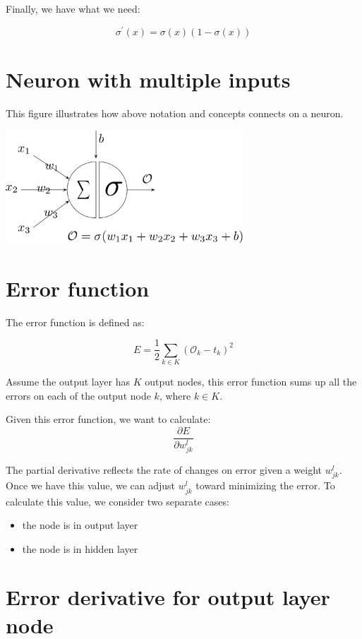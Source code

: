 \documentclass[11pt]{article}
\begin{document}
Finally, we have what we need:

\begin{equation}
\sigma^\prime(x) = \sigma(x)(1-\sigma(x))
\end{equation}


\section{Neuron with multiple inputs}

This figure illustrates how above notation and concepts connects on a neuron.

\includegraphics[width=3.5in]{neuron-connect.pdf}


\section{Error function}

The error function is defined as:

\begin{equation}
E = \frac{1}{2} \sum_{k \in K}(\mathcal{O}_k - t_k)^2
\end{equation}

Assume the output layer has $K$ output nodes, this error function sums up all the errors on each of the output node $k$, where $k \in K$.

Given this error function, we want to calculate:
\[ \frac{\partial E}{\partial w_{jk}^l} \]

The partial derivative reflects the rate of changes on error given a weight $w_{jk}^l$. Once we have this value, we can adjust $w_{jk}^l$ toward minimizing the error. To calculate this value, we consider two separate cases:

\begin{itemize}
\item the node is in output layer
\item the node is in hidden layer
\end{itemize}

\section{Error derivative for output layer node}
\end{document}
